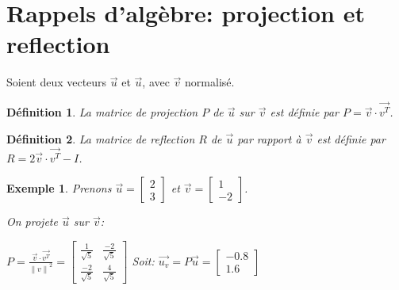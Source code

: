 \documentclass[a4paper]{article}
\newcommand\norm[1]{\left\lVert#1\right\rVert}
\newtheorem{definition}{Définition}
\newtheorem{ex}{Exemple}
\begin{document}
\maketitle

\section{Rappels d'algèbre: projection et reflection}

Soient deux vecteurs $\overrightarrow{u}$ et $\overrightarrow{u}$, avec $\overrightarrow{v}$ normalisé.

\begin{definition}
  La matrice de projection $P$ de $\overrightarrow{u}$ sur $\overrightarrow{v}$ est définie par $P = \overrightarrow{v} \cdot \overrightarrow{v^T}$.
\end{definition}

\begin{definition}
  La matrice de reflection $R$ de $\overrightarrow{u}$ par rapport à $\overrightarrow{v}$ est définie par $R = 2 \overrightarrow{v} \cdot \overrightarrow{v^T} - I$.
\end{definition}

\begin{ex}
Prenons $\overrightarrow{u}=\begin{bmatrix}2\\3\end{bmatrix}$ et $\overrightarrow{v}=\begin{bmatrix}1\\-2\end{bmatrix}$.

On projete $\overrightarrow{u}$ sur $\overrightarrow{v}$:

$P = \frac{\overrightarrow{v} \cdot \overrightarrow{v^T}}{\norm{v}^2} = \begin{bmatrix}\frac{1}{\sqrt{5}} & \frac{-2}{\sqrt{5}}\\\frac{-2}{\sqrt{5}} & \frac{4}{\sqrt{5}}\end{bmatrix}$
\medbreak
Soit: $\overrightarrow{u_v} = P\overrightarrow{u} = \begin{bmatrix}-0.8\\1.6\end{bmatrix}$
\end{ex}
\end{document}
